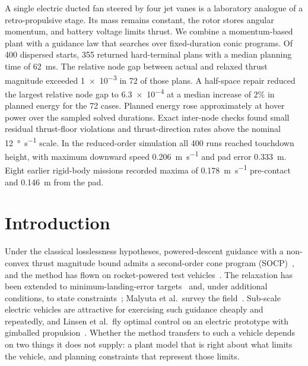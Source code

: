 \documentclass[10pt,letterpaper]{article}
\begin{document}

{\renewcommand{\thefootnote}{\fnsymbol{footnote}}%
}
\setcounter{footnote}{0}

\begin{aiaaabstract}
A single electric ducted fan steered by four jet vanes is a laboratory analogue of a retro-propulsive stage. Its mass remains constant, the rotor stores angular momentum, and battery voltage limits thrust.
We combine a momentum-based plant with a guidance law that searches over fixed-duration conic programs.
Of 400 dispersed starts, 355 returned hard-terminal plans with a median planning time of \SI{62}{\milli\second}.
The relative node gap between actual and relaxed thrust magnitude exceeded \num{1e-3} in 72 of those plans. A half-space repair reduced the largest relative node gap to \num{6.3e-4} at a median increase of 2\% in planned energy for the 72 cases.
Planned energy rose approximately at hover power over the sampled solved durations. Exact inter-node checks found small residual thrust-floor violations and thrust-direction rates above the nominal \SI{12}{\degree\per\second} scale.
In the reduced-order simulation all 400 runs reached touchdown height, with maximum downward speed \SI{0.206}{\metre\per\second} and pad error \SI{0.333}{\metre}. Eight earlier rigid-body missions recorded maxima of \SI{0.178}{\metre\per\second} pre-contact and \SI{0.146}{\metre} from the pad.
\end{aiaaabstract}

\section{Introduction}

Under the classical losslessness hypotheses, powered-descent guidance with a non-convex thrust magnitude bound admits a second-order cone program (SOCP)~\cite{acikmese2007,acikmese2013lcvx}, and the method has flown on rocket-powered test vehicles~\cite{scharf2017}.
The relaxation has been extended to minimum-landing-error targets~\cite{blackmore2010mle} and, under additional conditions, to state constraints~\cite{harris2014lcvx}; Malyuta et al.\ survey the field~\cite{malyuta2022convex}.
Sub-scale electric vehicles are attractive for exercising such guidance cheaply and repeatedly, and Linsen et al.\ fly optimal control on an electric prototype with gimballed propulsion~\cite{linsen2022}.
Whether the method transfers to such a vehicle depends on two things it does not supply: a plant model that is right about what limits the vehicle, and planning constraints that represent those limits.
\end{document}
